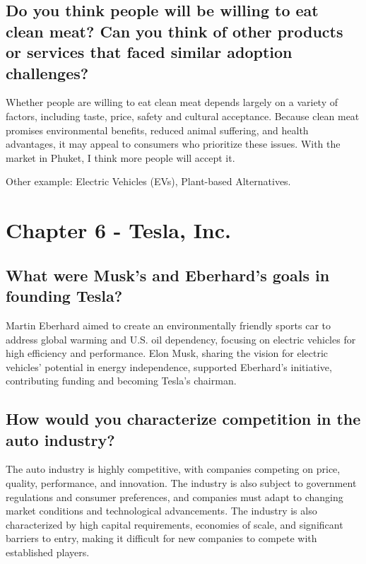 \documentclass[UTF8,a4paper,AutoFakeBold,AutoFakeSlant]{article}
\begin{document}
\subsection{Do you think people will be willing to eat clean meat? Can you think of other products or services that faced similar adoption challenges?}

Whether people are willing to eat clean meat depends largely on a variety of factors, including taste, price, safety and cultural acceptance. Because clean meat promises environmental benefits, reduced animal suffering, and health advantages, it may appeal to consumers who prioritize these issues. With the market in Phuket, I think more people will accept it.

Other example: Electric Vehicles (EVs), Plant-based Alternatives.



\section{Chapter 6 - Tesla, Inc.}

\subsection{What were Musk’s and Eberhard’s goals in founding Tesla?}

Martin Eberhard aimed to create an environmentally friendly sports car to address global warming and U.S. oil dependency, focusing on electric vehicles for high efficiency and performance. Elon Musk, sharing the vision for electric vehicles' potential in energy independence, supported Eberhard's initiative, contributing funding and becoming Tesla's chairman.


\subsection{How would you characterize competition in the auto industry?}

The auto industry is highly competitive, with companies competing on price, quality, performance, and innovation. The industry is also subject to government regulations and consumer preferences, and companies must adapt to changing market conditions and technological advancements. The industry is also characterized by high capital requirements, economies of scale, and significant barriers to entry, making it difficult for new companies to compete with established players.
\end{document}
